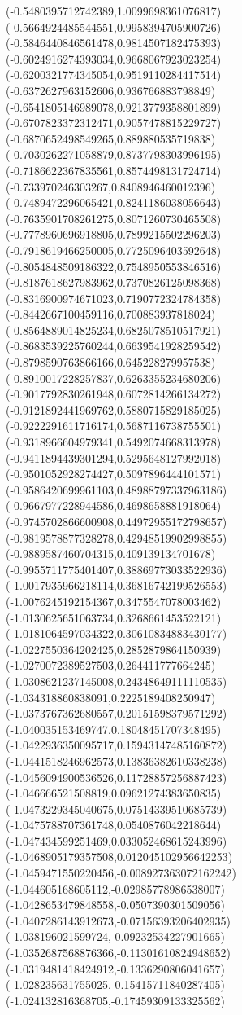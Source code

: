 {(-0.5480395712742389,1.0099698361076817)
(-0.5664924485544551,0.9958394705900726)
(-0.5846440846561478,0.9814507182475393)
(-0.6024916274393034,0.9668067923023254)
(-0.6200321774345054,0.9519110284417514)
(-0.6372627963152606,0.936766883798849)
(-0.6541805146989078,0.9213779358801899)
(-0.6707823372312471,0.9057478815229727)
(-0.6870652498549265,0.889880535719838)
(-0.7030262271058879,0.8737798303996195)
(-0.7186622367835561,0.8574498131724714)
(-0.733970246303267,0.8408946460012396)
(-0.7489472296065421,0.8241186038056643)
(-0.7635901708261275,0.8071260730465508)
(-0.7778960696918805,0.7899215502296203)
(-0.7918619466250005,0.7725096403592648)
(-0.8054848509186322,0.7548950553846516)
(-0.8187618627983962,0.7370826125098368)
(-0.8316900974671023,0.7190772324784358)
(-0.8442667100459116,0.700883937818024)
(-0.8564889014825234,0.6825078510517921)
(-0.8683539225760244,0.6639541928259542)
(-0.8798590763866166,0.645228279957538)
(-0.8910017228257837,0.6263355234680206)
(-0.9017792830261948,0.6072814266134272)
(-0.9121892441969762,0.5880715829185025)
(-0.9222291611716174,0.5687116738755501)
(-0.9318966604979341,0.5492074668313978)
(-0.9411894439301294,0.5295648127992018)
(-0.9501052928274427,0.5097896444101571)
(-0.9586420699961103,0.48988797337963186)
(-0.9667977228944586,0.4698658881918064)
(-0.9745702866600908,0.44972955172798657)
(-0.9819578877328278,0.42948519902998855)
(-0.9889587460704315,0.409139134701678)
(-0.9955711775401407,0.38869773033522936)
(-1.0017935966218114,0.36816742199526553)
(-1.0076245192154367,0.3475547078003462)
(-1.0130625651063734,0.3268661453522121)
(-1.0181064597034322,0.30610834883430177)
(-1.0227550364202425,0.2852879864150939)
(-1.0270072389527503,0.264411777664245)
(-1.0308621237145008,0.24348649111110535)
(-1.034318860838091,0.2225189408250947)
(-1.0373767362680557,0.20151598379571292)
(-1.040035153469747,0.18048451707348495)
(-1.0422936350095717,0.15943147485160872)
(-1.0441518246962573,0.13836382610338238)
(-1.0456094900536526,0.11728857256887423)
(-1.046666521508819,0.09621274383650835)
(-1.0473229345040675,0.07514339510685739)
(-1.0475788707361748,0.0540876042218644)
(-1.047434599251469,0.033052468615243996)
(-1.0468905179357508,0.012045102956642253)
(-1.0459471550220456,-0.008927363072162242)
(-1.044605168605112,-0.02985778986538007)
(-1.0428653479848558,-0.0507390301509056)
(-1.0407286143912673,-0.07156393206402935)
(-1.038196021599724,-0.09232534227901665)
(-1.0352687568876366,-0.11301610824948652)
(-1.0319481418424912,-0.1336290806041657)
(-1.028235631755025,-0.15415711840287405)
(-1.024132816368705,-0.17459309133325562)
}

